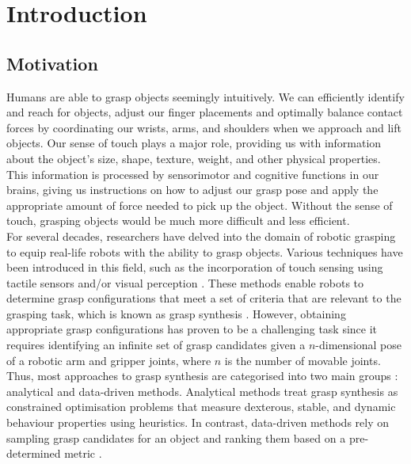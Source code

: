 \documentclass[11pt, a4paper]{report}
\begin{document}
\tableofcontents


\chapter{Introduction}
\label{chap:1}
\setcounter{page}{1}


\section{Motivation}
\label{sec:1.1}
Humans are able to grasp objects seemingly intuitively. We can efficiently identify and reach for objects, adjust our finger placements and optimally balance contact forces by coordinating our wrists, arms, and shoulders when we approach and lift objects. Our sense of touch plays a major role, providing us with information about the object's size, shape, texture, weight, and other physical properties. This information is processed by sensorimotor and cognitive functions \cite{castiello2005} in our brains, giving us instructions on how to adjust our grasp pose and apply the appropriate amount of force needed to pick up the object. Without the sense of touch, grasping objects would be much more difficult and less efficient.\\

For several decades, researchers have delved into the domain of robotic grasping to equip real-life robots with the ability to grasp objects. Various techniques have been introduced in this field, such as the incorporation of touch sensing \cite{de_Farias_2021} using tactile sensors \cite{Lambeta2020DIGIT, liu2022gelsight} and/or visual perception \cite{Calandra_2018}. These methods enable robots to determine grasp configurations that meet a set of criteria that are relevant to the grasping task, which is known as grasp synthesis \cite{Bohg_2014}. However, obtaining appropriate grasp configurations has proven to be a challenging task since it requires identifying an infinite set of grasp candidates given a $n$-dimensional pose of a robotic arm and gripper joints, where $n$ is the number of movable joints. Thus, most approaches to grasp synthesis are categorised into two main groups \cite{Bohg_2014, SAHBANI2012326}: analytical and data-driven methods. Analytical methods treat grasp synthesis as constrained optimisation problems that measure dexterous, stable, and dynamic behaviour properties using heuristics. In contrast, data-driven methods rely on sampling grasp candidates for an object and ranking them based on a pre-determined metric \cite{Bohg_2014}.\\
\end{document}
